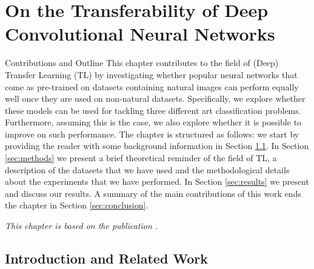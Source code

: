 \chapter{On the Transferability of Deep Convolutional Neural Networks}
\label{ch:tl_natural_to_non_natural}

\begin{remark}{Contributions and Outline} 
	This chapter contributes to the field of (Deep) Transfer Learning (TL) by investigating whether popular neural networks that come as pre-trained on datasets containing natural images can perform equally well once they are used on non-natural datasets. Specifically, we explore whether these models can be used for tackling three different art classification problems. Furthermore, assuming this is the case, we also explore whether it is possible to improve on such performance. The chapter is structured as follows: we start by providing the reader with some background information in Section \ref{sec:introduction}. In Section \ref{sec:methods} we present a brief theoretical reminder of the field of TL, a description of the datasets that we have used and the methodological details about the experiments that we have performed. In Section \ref{sec:results} we present and discuss our results. A summary of the main contributions of this work ends the chapter in Section \ref{sec:conclusion}.

\vspace{5mm}

\textit{This chapter is based on the publication \citet{sabatelli2018deep}.}
\end{remark}


\section{Introduction and Related Work}
\label{sec:introduction}

